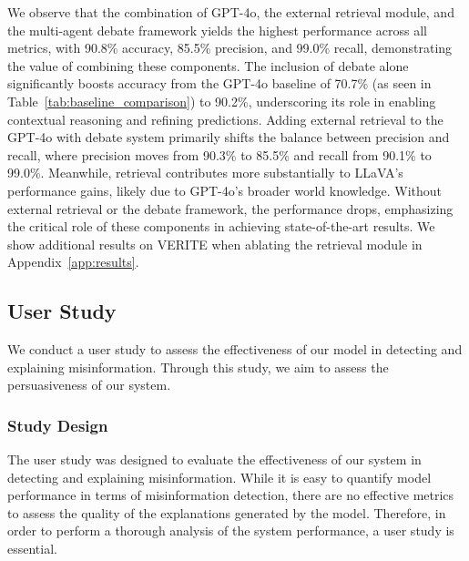 \documentclass{article}
\theoremstyle{plain}
\theoremstyle{definition}
\theoremstyle{remark}
\begin{document}
We observe that the combination of GPT-4o, the external retrieval module, and the multi-agent debate framework yields the highest performance across all metrics, with 90.8\% accuracy, 85.5\% precision, and 99.0\% recall, demonstrating the value of combining these components. The inclusion of debate alone significantly boosts accuracy from the GPT-4o baseline of 70.7\% (as seen in Table~\ref{tab:baseline_comparison}) to 90.2\%, underscoring its role in enabling contextual reasoning and refining predictions. Adding external retrieval to the GPT-4o with debate system primarily shifts the balance between precision and recall, where precision moves from 90.3\% to 85.5\% and recall from 90.1\% to 99.0\%. Meanwhile, retrieval contributes more substantially to LLaVA’s performance gains, likely due to GPT-4o’s broader world knowledge. Without external retrieval or the debate framework, the performance drops, emphasizing the critical role of these components in achieving state-of-the-art results. We show additional results on VERITE when ablating the retrieval module in Appendix~\ref{app:results}.



\subsection{User Study}\label{app:user_study}
We conduct a user study to assess the effectiveness of our model in detecting and explaining misinformation. Through this study, we aim to assess the persuasiveness of our system.

\subsubsection{Study Design}
The user study was designed to evaluate the effectiveness of our system in detecting and explaining misinformation. While it is easy to quantify model performance in terms of misinformation detection, there are no effective metrics to assess the quality of the explanations generated by the model. Therefore, in order to perform a thorough analysis of the system performance, a user study is essential.
\end{document}
